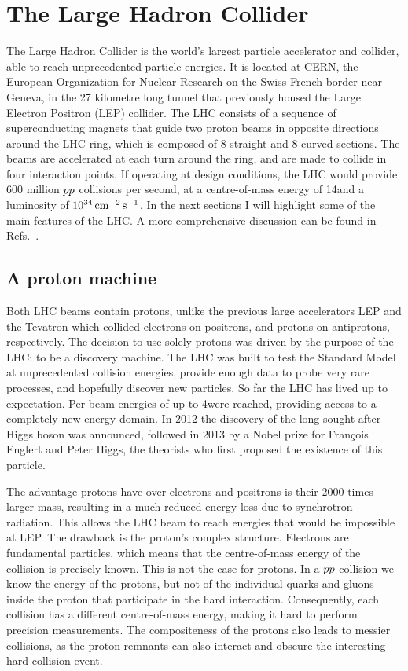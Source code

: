 \section{The Large Hadron Collider \label{chap:LHC}}

The Large Hadron Collider is the world's largest particle accelerator and collider, able to
reach unprecedented particle energies. It is located at CERN, the European Organization for Nuclear
Research on the Swiss-French border near Geneva, in the 27 kilometre long tunnel that previously
housed the Large Electron Positron (LEP) collider. The LHC consists of a sequence of superconducting
magnets that guide two proton beams in opposite directions around the LHC ring, which is composed
of 8 straight and 8 curved sections. 
The beams are accelerated at each turn around the ring, and are made to collide in four interaction
points.
If operating at design conditions, the LHC would provide 600 million ${p}{p}$
collisions per second, at a centre-of-mass energy of 14\TeV and a luminosity of
$\text{10}^\text{34}\,\text{cm}^\text{$-$2}\,\text{s}^\text{$-$1}$. 
In the next sections I will highlight some of the main features of the LHC. A more comprehensive
discussion
can be found in Refs.~\cite{Evans:2008zzb,Bruning:2007zzc,Lefevre:1165534,LHC_website}. 

\subsection{A proton machine \label{sec:LHC_proton_machine}}

Both LHC beams contain protons, unlike the previous large accelerators LEP and the Tevatron which
collided electrons on positrons, and protons on antiprotons, respectively. 
The decision to use solely protons was driven by the purpose of the LHC: to be a discovery machine.
The LHC was built to test the Standard Model at unprecedented collision energies, provide
enough data to
probe very rare processes, and hopefully discover new particles. So far the LHC has lived up to
expectation. Per beam energies of up to 4\TeV were reached, providing access to a completely new
energy domain. In 2012 the discovery of the long-sought-after Higgs boson was announced, followed in
2013 by a Nobel prize for Fran\c{c}ois Englert and Peter Higgs, the theorists who first proposed
the existence of this particle. 

The advantage protons have over electrons and positrons is their 2000 times larger mass, resulting
in a much reduced energy loss due to synchrotron radiation. This allows the LHC beam to reach
energies that would be impossible at LEP.
The drawback is the proton's complex structure. Electrons are fundamental particles, which
means that the centre-of-mass energy of the collision is precisely known. This is not the case for
protons. In a ${p}{p}$ collision we know the energy of the protons, but not of the individual quarks
and gluons inside the proton that participate in the hard interaction. Consequently, each collision
has a different centre-of-mass energy, making it hard to perform precision measurements. The
compositeness of the protons also leads to messier collisions, as the proton remnants can also
interact and obscure the interesting hard collision event. 

